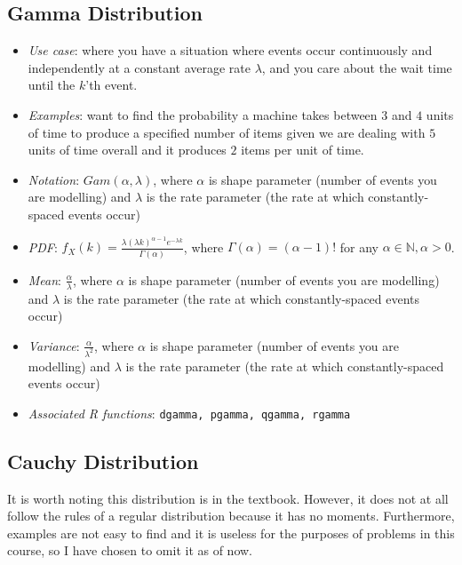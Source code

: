 \documentclass[12pt]{article}
\begin{document}
\subsection{Gamma Distribution}

\begin{itemize}
	\item \textit{Use case}: where you have a situation where events occur
	      continuously and independently at a constant average rate $\lambda$,
	      and you care about the wait time until the $k$'th event.
	\item \textit{Examples}: want to find the probability a machine takes
	      between $3$ and $4$ units of time to produce a specified number of items given
	      we are dealing with $5$ units of time overall and it produces $2$ items
	      per unit of time.
	\item \textit{Notation}: $Gam(\alpha, \lambda)$, where $\alpha$ is shape
	      parameter (number of events you are modelling) and $\lambda$ is the
	      rate parameter (the rate at which constantly-spaced events occur)
	\item \textit{PDF}: $f_X(k) = \frac{\lambda(\lambda k)^{\alpha - 1}
			      e^{-\lambda k}}{\Gamma(\alpha)}$, where $\Gamma(\alpha) =
		      (\alpha - 1)!$ for any $\alpha \in \mathbb{N}, \alpha > 0$.
	\item \textit{Mean}: $\frac{\alpha}{\lambda}$, where $\alpha$ is shape
	      parameter (number of events you are modelling) and $\lambda$ is the
	      rate parameter (the rate at which constantly-spaced events occur)
	\item \textit{Variance}: $\frac{\alpha}{\lambda^2}$, where $\alpha$ is shape
	      parameter (number of events you are modelling) and $\lambda$ is the
	      rate parameter (the rate at which constantly-spaced events occur)
	\item \textit{Associated R functions}: \verb|dgamma, pgamma, qgamma, rgamma|
\end{itemize}

\subsection{Cauchy Distribution}

It is worth noting this distribution is in the textbook. However, it does not
at all follow the rules of a regular distribution because it has no moments.
Furthermore, examples are not easy to find and it is useless for the purposes
of problems in this course, so I have chosen to omit it as of now.
\end{document}
